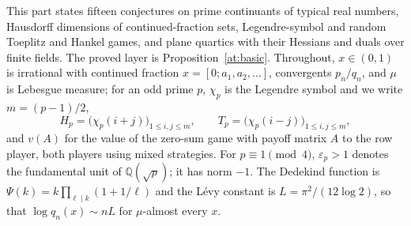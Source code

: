 \documentclass[11pt]{article}
\theoremstyle{definition}
\newcommand{\Q}{\mathbb Q}
\newcommand{\eps}{\varepsilon}
\providecommand{\Q}{\mathbb Q}
\begin{document}
This part states fifteen conjectures on prime continuants of typical real numbers, Hausdorff dimensions of continued-fraction sets, Legendre-symbol and random Toeplitz and Hankel games, and plane quartics with their Hessians and duals over finite fields.  The proved layer is Proposition~\ref{at:basic}.
Throughout, $x\in(0,1)$ is irrational with continued fraction
$x=[0;a_1,a_2,\dots]$, convergents $p_n/q_n$, and $\mu$ is Lebesgue
measure; for an odd prime $p$, $\chi_p$ is the Legendre symbol and we write
$m=(p-1)/2$,
\[
 H_p=\bigl(\chi_p(i+j)\bigr)_{1\le i,j\le m},\qquad
 T_p=\bigl(\chi_p(i-j)\bigr)_{1\le i,j\le m},
\]
and $v(A)$ for the value of the zero-sum game with payoff matrix $A$ to the
row player, both players using mixed strategies.  For $p\equiv1\pmod4$,
$\eps_p>1$ denotes the fundamental unit of $\Q(\sqrt p)$; it has norm $-1$.
The Dedekind function is $\Psi(k)=k\prod_{\ell\mid k}(1+1/\ell)$ and the
L\'evy constant is $L=\pi^2/(12\log 2)$, so that $\log q_n(x)\sim nL$ for
$\mu$-almost every $x$.
\end{document}
